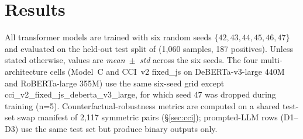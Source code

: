 \section{Results}
\label{sec:results}

All transformer models are trained with six random seeds $\{42, 43, 44, 45, 46, 47\}$ and evaluated on the held-out test split of \dataset{} (1{,}060 samples, 187 positives). Unless stated otherwise, values are \emph{mean~$\pm$~std} across the six seeds. The four multi-architecture cells (Model~C and CCI~v2 fixed\_js on DeBERTa-v3-large 440M and RoBERTa-large 355M) use the same six-seed grid except cci\_v2\_fixed\_js\_deberta\_v3\_large, for which seed 47 was dropped during training (n=5). Counterfactual-robustness metrics are computed on a shared test-set swap manifest of 2{,}117 symmetric pairs (\S\ref{sec:cci}); prompted-LLM rows (D1--D3) use the same test set but produce binary outputs only.


